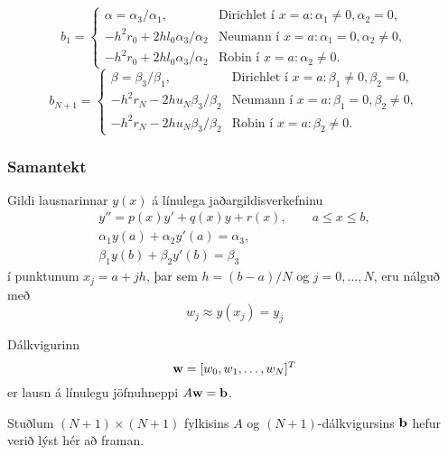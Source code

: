 \documentclass[icelandic,a4paper,12pt]{article}
\begin{document}
$$
b_{1}=
\begin{cases}
  \alpha=\alpha_3/\alpha_1,
&\text{Dirichlet í } x=a: \alpha_1\neq 0, \alpha_2=0,\\
-h^2r_0+2hl_0\alpha_3/\alpha_2
&\text{Neumann í } x=a:  \alpha_1=0, \alpha_2\neq 0,\\
-h^2r_0+2hl_0\alpha_3/\alpha_2&\text{Robin í } x=a:  \alpha_2\neq 0.
\end{cases} 
$$
$$
b_{N+1}=
\begin{cases}
  \beta=\beta_3/\beta_1,
&\text{Dirichlet í } x=a: \beta_1\neq 0, \beta_2=0,\\
-h^2r_N-2hu_N\beta_3/\beta_2&\text{Neumann í } x=a:  \beta_1=0, \beta_2\neq 0,\\
-h^2r_N-2hu_N\beta_3/\beta_2&\text{Robin í } x=a:  \beta_2\neq 0.
\end{cases} 
$$



\subsubsection{Samantekt} 
Gildi lausnarinnar $y(x)$ á  línulega jaðargildisverkefninu
  \begin{gather*}
    y''=p(x)y'+q(x)y+r(x), \qquad a\leq x\leq b,\\
\alpha_1y(a)+\alpha_2 y'(a)=\alpha_3,\\
\beta_1 y(b)+\beta_2y'(b)=\beta_3  
  \end{gather*}
í punktunum $x_j=a+jh$, þar sem $h=(b-a)/N$ og $j=0,\dots,N$,
eru nálguð með
$$
w_j\approx y(x_j)=y_j
$$ 

\pause
\smallskip
Dálkvigurinn
$$
\mbox{${\bf w}$}=[w_0,w_1,\dots,w_N]^T
$$
er lausn á línulegu jöfnuhneppi
$A\mbox{${\bf w}$}=\mbox{${\bf b}$}$.

\smallskip
Stuðlum $(N+1)\times(N+1)$ fylkisins $A$ og
$(N+1)$-dálkvigursins $\mbox{${\bf b}$}$ hefur verið lýst hér að framan.
\end{document}
